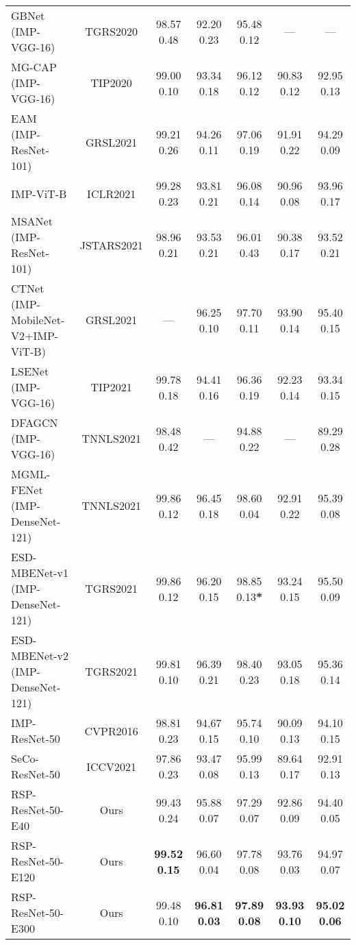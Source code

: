 \documentclass[10pt, journal,twoside]{IEEEtran}
\begin{document}
\begin{table*}[t]
{\begin{tabular}{l|c|c|c|c|c|c}
  GBNet (IMP-VGG-16) \cite{sun_2019_GBNet} & TGRS2020 & 98.57  0.48 & 92.20  0.23 & 95.48  0.12 & --- & --- \\
  MG-CAP (IMP-VGG-16) \cite{asr_2020_tip_mgcap} & TIP2020 & 99.00  0.10 & 93.34  0.18 & 96.12  0.12 & 90.83  0.12 & 92.95  0.13 \\
  EAM (IMP-ResNet-101) \cite{asr_2021_grsl_eam} & GRSL2021 & 99.21  0.26 & 94.26  0.11 & 97.06  0.19 & 91.91  0.22 & 94.29  0.09 \\
  IMP-ViT-B \cite{vit} & ICLR2021 & 99.28  0.23 & 93.81  0.21 & 96.08  0.14 & 90.96  0.08 & 93.96  0.17 \\
  MSANet (IMP-ResNet-101) \cite{asr_2021_jstars_msanet}  & JSTARS2021 & 98.96  0.21 & 93.53  0.21 & 96.01  0.43 & 90.38  0.17 & 93.52  0.21 \\
  CTNet (IMP-MobileNet-V2+IMP-ViT-B) \cite{cnn_transformer_2022_asr} & GRSL2021 & --- & 96.25  0.10 & 97.70  0.11 & 93.90  0.14 & 95.40  0.15 \\
  LSENet (IMP-VGG-16) \cite{lse_2021_asr} & TIP2021 & 99.78  0.18 & 94.41  0.16& 96.36  0.19 & 92.23  0.14 & 93.34  0.15 \\ 
  DFAGCN (IMP-VGG-16) \cite{xu2021_dfagcn} & TNNLS2021 & 98.48  0.42 & --- & 94.88  0.22 & --- & 89.29  0.28 \\
  MGML-FENet (IMP-DenseNet-121) \cite{mgmlnet_asr_2021_featurepartioning}& TNNLS2021 & 99.86  0.12 & 96.45  0.18 & 98.60  0.04 & 92.91  0.22 & 95.39  0.08 \\
  ESD-MBENet-v1 (IMP-DenseNet-121) \cite{ESDMBENet_2021_asr}& TGRS2021 & 99.86  0.12 & 96.20  0.15 & 98.85  0.13\textbf{*} & 93.24  0.15 & 95.50  0.09 \\ 
  ESD-MBENet-v2 (IMP-DenseNet-121) \cite{ESDMBENet_2021_asr}& TGRS2021 & 99.81  0.10 & 96.39  0.21 & 98.40  0.23 & 93.05  0.18 & 95.36  0.14 \\
  \hline
  IMP-ResNet-50 \cite{resnet} & CVPR2016 & 98.81  0.23 & 94.67  0.15 & 95.74  0.10 & 90.09  0.13 & 94.10  0.15 \\
  SeCo-ResNet-50 \cite{seco} & ICCV2021 & 97.86  0.23 & 93.47  0.08 & 95.99  0.13 & 89.64  0.17 & 92.91  0.13 \\
  RSP-ResNet-50-E40 &  Ours  & 99.43  0.24 & 95.88  0.07 & 97.29  0.07 & 92.86  0.09 & 94.40  0.05 \\
  RSP-ResNet-50-E120 & Ours & \bfseries 99.52  0.15 &  96.60  0.04 & 97.78  0.08 & 93.76  0.03 & 94.97  0.07\\
  RSP-ResNet-50-E300 & Ours & 99.48  0.10 & \bfseries 96.81  0.03 & \bfseries 97.89  0.08 & \bfseries 93.93  0.10 & \bfseries 95.02  0.06\\

\end{tabular}}
\end{table*}
\end{document}
